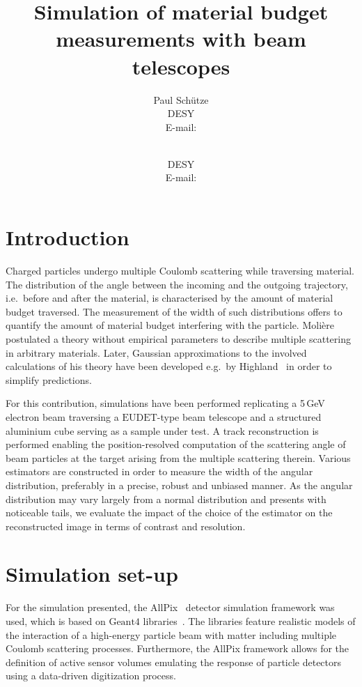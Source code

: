 \documentclass{PoS}
\title{Simulation of material budget measurements with beam telescopes}
\author{Paul Sch\"utze\\
        DESY\\
        E-mail: \email{paul.schuetze@desy.de}}
\author{\speaker{Hendrik Jansen}\\
        DESY\\
        E-mail: \email{hendrik.jansen@desy.de}}
\newcommand{\eudet}{\ensuremath{\textrm{EUDET}}}
\newcommand{\Geant}{\ensuremath{\textrm{Geant4}}}
\begin{document}
\linenumbers
\section{Introduction}
Charged particles undergo multiple Coulomb scattering while traversing material. 
The distribution of the angle between the incoming and the outgoing trajectory, i.e.\ before and after the material, is characterised by the amount of material budget traversed. 
The measurement of the width of such distributions offers to quantify the amount of material budget interfering with the particle. 
Moli\`ere~\cite{moliere} postulated a theory without empirical parameters to describe multiple scattering in arbitrary materials.
Later, Gaussian approximations to the involved calculations of his theory have been developed e.g.\ by Highland~\cite{ref:scatteringhighland} in order to simplify predictions.

For this contribution, simulations have been performed replicating a 5\,GeV electron beam traversing a $\eudet$-type beam telescope \cite{JansenEPJ} and a structured aluminium cube serving as a sample under test. 
A track reconstruction is performed enabling the position-resolved computation of the scattering angle of beam particles at the target arising from the multiple scattering therein.
Various estimators are constructed in order to measure the width of the angular distribution, preferably  in a precise, robust and unbiased manner. 
As the angular distribution may vary largely from a normal distribution and presents with noticeable tails,
 we evaluate the impact of the choice of the estimator on the reconstructed image in terms of contrast and resolution. 


\section{Simulation set-up}
For the simulation presented, the AllPix~\cite{ref:AllPix} detector simulation framework was used, which is based on $\Geant$ libraries~\cite{Agostinelli2003250,1610988}.
The libraries feature realistic models of the interaction of a high-energy particle beam with matter including multiple Coulomb scattering processes.
Furthermore, the AllPix framework allows for the definition of active sensor volumes emulating the response of particle detectors using a data-driven digitization process. 
\end{document}
